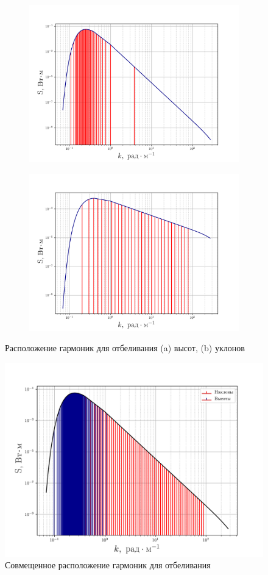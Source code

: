 \begin{figure}[h!]
    \begin{subfigure}{0.49\linewidth}
        \includegraphics[width=\linewidth]{fig/fig1}
        \caption{}
    \end{subfigure}
    \begin{subfigure}{0.49\linewidth}
        \includegraphics[width=\linewidth]{fig/fig2}
        \caption{}
    \end{subfigure}
    \caption{Расположение гармоник для отбеливания (a) высот, (b) уклонов}
\end{figure}
\begin{figure}[h!]
    \centering
    \includegraphics[width=0.6\linewidth]{fig/fig3}
    \caption{Совмещенное расположение гармоник для отбеливания}
    \label{fig:}
\end{figure}


